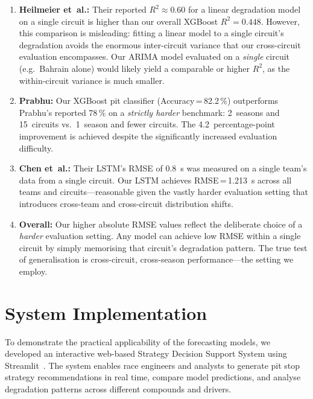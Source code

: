 \documentclass[journal,twoside]{IEEEtran}
\begin{document}
\begin{enumerate}
  \item \textbf{Heilmeier et~al.:}  Their reported $R^{2} \approx 0.60$
  for a linear degradation model on a single circuit is higher than our
  overall XGBoost $R^{2}=0.448$.  However, this comparison is misleading:
  fitting a linear model to a single circuit's degradation avoids the
  enormous inter-circuit variance that our cross-circuit evaluation
  encompasses.  Our ARIMA model evaluated on a \emph{single} circuit
  (e.g.\ Bahrain alone) would likely yield a comparable or higher
  $R^{2}$, as the within-circuit variance is much smaller.

  \item \textbf{Prabhu:}  Our XGBoost pit classifier
  (Accuracy\,=\,82.2\,\%) outperforms Prabhu's reported 78\,\% on a
  \emph{strictly harder} benchmark: 2~seasons and 15~circuits vs.\
  1~season and fewer circuits.  The 4.2~percentage-point improvement is
  achieved despite the significantly increased evaluation difficulty.

  \item \textbf{Chen et~al.:}  Their LSTM's RMSE of \SI{0.8}{\second}
  was measured on a single team's data from a single circuit.  Our LSTM
  achieves RMSE\,=\,\SI{1.213}{\second} across all teams and
  circuits---reasonable given the vastly harder evaluation setting that
  introduces cross-team and cross-circuit distribution shifts.

  \item \textbf{Overall:}  Our higher absolute RMSE values reflect the
  deliberate choice of a \emph{harder} evaluation setting.  Any model
  can achieve low RMSE within a single circuit by simply memorising that
  circuit's degradation pattern.  The true test of generalisation is
  cross-circuit, cross-season performance---the setting we employ.
\end{enumerate}

\section{System Implementation}\label{sec:system}

To demonstrate the practical applicability of the forecasting models,
we developed an interactive web-based Strategy Decision Support System
using Streamlit~\cite{streamlit2020}.  The system enables race
engineers and analysts to generate pit stop strategy recommendations
in real time, compare model predictions, and analyse degradation
patterns across different compounds and drivers.
\end{document}
